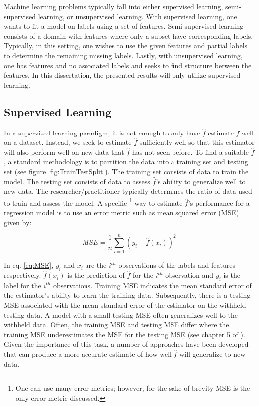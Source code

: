 Machine learning problems typically fall into either supervised learning, semi-supervised learning, or unsupervised learning. With supervised learning, one wants to fit a model on labels using a set of features. Semi-supervised learning consists of a domain with features where only a subset have corresponding labels. Typically, in this setting, one wishes to use the given features and partial labels to determine the remaining missing labels. Lastly, with unsupervised learning, one has features and no associated labels and seeks to find structure between the features.  In this dissertation, the presented results will only utilize supervised learning. 

\subsection{Supervised Learning} \label{sec:SupervisedLearning}
In a supervised learning paradigm, it is not enough to only have \(\hat{f}\) estimate \(f\) well on a dataset. Instead, we seek to estimate \(\hat{f}\) sufficiently well so that this estimator will also perform well on new data that  \(\hat{f}\) has not seen before. To find a suitable \(\hat{f}\), a standard methodology is to partition the data into a training set and testing set (see figure \ref{fig:TrainTestSplit}). The training set consists of data to train the model. The testing set consists of data to assess \(\hat{f}\)'s ability to generalize well to new data. The researcher/practitioner typically determines the ratio of data used to train and assess the model.  A specific  \footnote{One can use many error metrics; however, for the sake of brevity MSE is the only error metric discussed.}  way to estimate  \(\hat{f}\)'s performance for a regression model is to use an error metric such as mean squared error (MSE) given by:  

\begin{equation}
\label{eq:MSE}
MSE = \frac{1}{n} \sum_{i=1}^n (y_i -\hat{f}(x_i))^2
\end{equation}

\noindent In eq. \ref{eq:MSE}, \(y_i\) and \(x_i\) are the \(i^{th}\) observations of the labels and features respectively. \(\hat{f}(x_i)\) is the prediction of \(\hat{f}\) for the \(i^{th}\) observation and \(y_i\) is the label for the \(i^{th}\) observations. Training MSE indicates the mean standard error of the estimator's ability to learn the training data.  Subsequently, there is a testing MSE associated with the mean standard error of the estimator on the withheld testing data. A model with a small testing MSE often generalizes well to the withheld data. Often, the training MSE and testing MSE differ where the training MSE underestimates the MSE for the testing MSE (see chapter 5 of \cite{ISL}). Given the importance of this task, a number of approaches have been developed that can produce a more accurate estimate of how well \(\hat{f}\) will generalize to new data.

